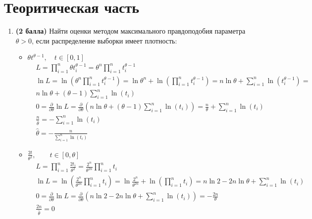 \documentclass{assignment}
\begin{document}

\section*{Теоритическая часть}
\begin{enumerate}
    \item \textbf{(2 балла)} Найти оценки методом максимального правдоподобия параметра $\theta > 0$, если распределение выборки имеет плотность:
    \begin{itemize}
        \item $\theta t^{\theta - 1}, \quad t \in [0, 1]$
        \start
        \begin{align*}
            &L = \prod_{i=1}^{n} \theta t_i^{\theta - 1} = \theta^n \prod_{i=1}^{n} t_i^{\theta - 1} \\
            &\ln L = \ln (\theta^n \prod_{i=1}^{n} t_i^{\theta - 1}) = \ln \theta^n + \ln (\prod_{i=1}^{n} t_i^{\theta - 1}) = n \ln \theta + \sum_{i=1}^{n} \ln (t_i^{\theta - 1}) = \\
            &n \ln \theta + (\theta - 1)\sum_{i=1}^{n} \ln (t_i) \\
            &0 = \frac{\partial}{\partial \theta}\ln L = \frac{\partial}{\partial \theta}(n \ln \theta + (\theta - 1)\sum_{i=1}^{n} \ln (t_i)) = \frac{n}{\theta} + \sum_{i=1}^{n}\ln (t_i) \\
            &\frac{n}{\hat{\theta}} = -\sum_{i=1}^{n}\ln (t_i) \\
            & \hat{\theta} = - \frac{n}{\sum_{i=1}^{n}\ln (t_i)}
        \end{align*}
        \finish
        \item $\displaystyle \frac{2t}{\theta^2},\quad \quad  t \in [0, \theta]$
        \start
        \begin{align*}
            &L = \prod_{i=1}^{n} \frac{2t_i}{\theta^2} = \frac{2^n}{\theta^{2n}} \prod_{i=1}^{n} t_i \\
            &\ln L = \ln (\frac{2^n}{\theta^{2n}} \prod_{i=1}^{n} t_i) = \ln \frac{2^n}{\theta^{2n}} + \ln (\prod_{i=1}^{n} t_i) = n \ln 2 - 2n \ln \theta + \sum_{i=1}^{n} \ln (t_i) \\
            &0 = \frac{\partial}{\partial \theta}\ln L = \frac{\partial}{\partial \theta}(n\ln 2 - 2n \ln \theta + \sum_{i=1}^{n} \ln (t_i)) = -\frac{2n}{\theta} \\
            &\frac{2n}{\hat{\theta}} = 0 \\

\end{align*}
\end{itemize}
\end{enumerate}
\end{document}
